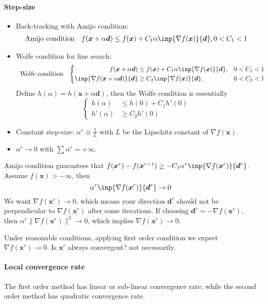 \paragraph{Step-size}
\begin{itemize}
\item
Back-tracking with Amijo condition:
\[
\begin{array}{ll}
\mbox{Amijo condition}
&
f(\bm x+\alpha\bm d)\le f(\bm x)+C_1\alpha\inp{\nabla f(\bm x)}{\bm d},0<C_1<1
\end{array}
\]
\item
Wolfe condition for line search:
\[
\begin{array}{ll}
\mbox{Wolfe condition}
&
\left\{
\begin{aligned}
f(\bm x+\alpha\bm d)&\le f(\bm x)+C_1\alpha\inp{\nabla f(\bm x)}{\bm d},&0<C_1<1\\
\inp{\nabla f(\bm x+\alpha\bm d)}{\bm d}&\ge C_2\inp{\nabla f(\bm x)}{\bm d}, &0<C_2<1
\end{aligned}
\right.
\end{array}
\]
Define $h(\alpha)=h(\bm x+\alpha\bm d)$, then the Wolfe condition is essentially
\[
\left\{
\begin{aligned}
h(\alpha)&\le h(0)+C_1h'(0)\\
h'(\alpha)&\ge C_2h'(0)
\end{aligned}
\right.
\]
\item
Constant step-size: $\alpha^r\equiv\frac{1}{L}$ with $L$ be the Lipschitz constant of $\nabla f(\bm x)$.
\item
$\alpha^r\to0$ with $\sum\alpha^r=+\infty$.
\end{itemize}
\begin{remark}
Amijo condition guarantees that $f(\bm x^r) - f(\bm x^{r+1})\ge-C_1\alpha^r\inp{\nabla f(\bm x^r)}{\bm d^r}$. Assume $f(\bm x)>-\infty$, then
\[
\alpha^r\inp{\nabla f(\bm x^r)}{\bm d^r}\to0
\]
We want $\nabla f(\bm x^r)\to0$, which means your direction $\bm d^r$ should not be perpendicular to $\nabla f(\bm x^r)$ after some iterations. If choosing $\bm d^r=-\nabla f(\bm x^r)$, then $\alpha^r\|\nabla f(\bm x^r)\|^2\to0$, which implies $\nabla f(\bm x^r)\to0$.
\end{remark}
Under reasonable conditions, applying first order condition we expect $\nabla f(\bm x^r)\to0$. Is $\bm x^r$ always convergent? not necessarily.

\paragraph{Local convergence rate}
The first order method has linear or sub-linear convergence rate; while the second order method has quadratic convergence rate.

